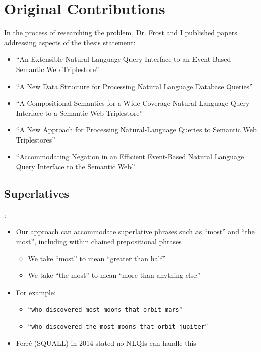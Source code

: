 \documentclass[logoontitle,tabu,supertabular,aspectratio=43]{preney-uwindsor-beamer}
\begin{document}
    \section{Original Contributions}

    \begin{frame}{\insertsection}
        In the process of researching the problem, Dr. Frost and I published papers addressing aspects of the thesis statement:
        \begin{itemize}
            \item ``An Extensible Natural-Language Query Interface to an Event-Based Semantic Web Triplestore'' \cite{frost2018extensible}
            \item ``A New Data Structure for Processing Natural Language Database Queries'' \cite{frostpeelar2019}
            \item ``A Compositional Semantics for a Wide-Coverage Natural-Language Query Interface to a Semantic Web Triplestore'' \cite{peelar2020compositional}
            \item ``A New Approach for Processing Natural-Language Queries to Semantic Web Triplestores'' \cite{peelar2020webistjournal}
            \item ``Accommodating Negation in an Efficient Event-Based Natural Language Query Interface to the Semantic Web'' \cite{peelarfrostwebist2020}
        \end{itemize}

    \end{frame}

    \subsection{Superlatives}
    \begin{frame}{\insertsection: \insertsubsection}
        \begin{itemize}
            \item Our approach can accommodate superlative phrases such as ``most'' and ``the most'', including within chained prepositional phrases
            \begin{itemize}
                \item We take ``most'' to mean ``greater than half''
                \item We take ``the most'' to mean ``more than anything else''
            \end{itemize}
            \item For example:
            \begin{itemize}
                \item ``\texttt{who discovered most moons that orbit mars}''
                \item ``\texttt{who discovered the most moons that orbit jupiter}''
            \end{itemize}
            \item Ferré (SQUALL) in 2014 stated no NLQIs can handle this \cite{ferre2014squall}
        \end{itemize}
    \end{frame}
\end{document}
